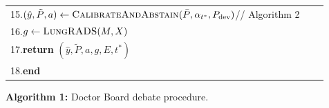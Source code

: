 \documentclass[12pt]{article}
\begin{document}
\begin{center}
\begin{tabular}{|p{0.94\linewidth}|}
15.\quad \hspace*{1.5em}$(\hat y, \tilde P, a) \gets \textsc{CalibrateAndAbstain}(\bar P, \alpha_{t^{*}}, P_{\mathrm{dev}})$\quad // Algorithm 2 \\
16.\quad \hspace*{1.5em}$g \gets \textsc{LungRADS}(M, X)$ \\
17.\quad \hspace*{1.5em}\textbf{return} $(\hat y, \tilde P, a, g, E, t^{*})$ \\
18.\quad \textbf{end} \\
\hline
\end{tabular}
\end{center}
\vspace{-2pt}
\begin{center}
\small\textbf{Algorithm 1:} Doctor Board debate procedure.
\end{center}
\vspace{4pt}
\end{document}
